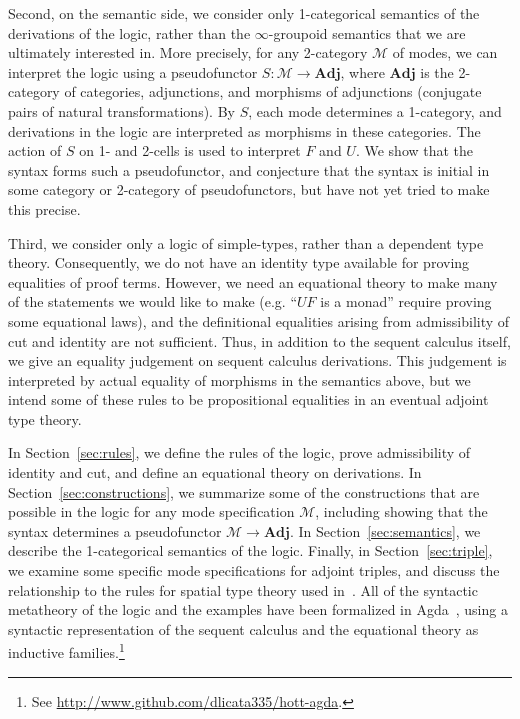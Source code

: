 \documentclass{drl-common/llncs}
\newcommand{\M}{\ensuremath{\mathcal{M}}}
\newcommand{\Adj}{\textbf{Adj}}
\begin{document}
Second, on the semantic side, we consider only 1-categorical semantics
of the derivations of the logic, rather than the $\infty$-groupoid
semantics that we are ultimately interested in.  More precisely, for any
2-category \M\/ of modes, we can interpret the logic using a
pseudofunctor $S : \M \to \Adj$, where $\Adj$ is the 2-category of
categories, adjunctions, and morphisms of adjunctions (conjugate pairs
of natural transformations).  By $S$, each mode determines a 1-category,
and derivations in the logic are interpreted as morphisms in these
categories.  The action of $S$ on 1- and 2-cells is used to interpret
$F$ and $U$.  We show that the syntax forms such a pseudofunctor, and
conjecture that the syntax is initial in some category or 2-category of
pseudofunctors, but have not yet tried to make this precise.

Third, we consider only a logic of simple-types, rather than a dependent
type theory.  Consequently, we do not have an identity type available
for proving equalities of proof terms.  However, we need an equational
theory to make many of the statements we would like to make (e.g. ``$UF$ is a monad''
require proving some equational laws), and the definitional equalities
arising from admissibility of cut and identity are not sufficient.
Thus, in addition to the sequent calculus itself, we give an equality
judgement on sequent calculus derivations.  This judgement is
interpreted by actual equality of morphisms in the semantics above, but
we intend some of these rules to be propositional equalities in an eventual
adjoint type theory.

In Section~\ref{sec:rules}, we define the rules of the logic, prove
admissibility of identity and cut, and define an equational theory on
derivations.  In Section~\ref{sec:constructions}, we summarize some of
the constructions that are possible in the logic for any mode
specification \M, including showing that the syntax determines a
pseudofunctor $\M \to \Adj$.  In Section~\ref{sec:semantics}, we
describe the 1-categorical semantics of the logic.  Finally, in
Section~\ref{sec:triple}, we examine some specific mode specifications
for adjoint triples, and discuss the relationship to the rules for
spatial type theory used in~\citep{shulman15realcohesion}.  All of the
syntactic metatheory of the logic and the examples have been formalized
in Agda~\citep{norell07thesis}, using a syntactic representation of the
sequent calculus and the equational theory as inductive
families.\footnote{See \url{http://www.github.com/dlicata335/hott-agda}.}
\end{document}
